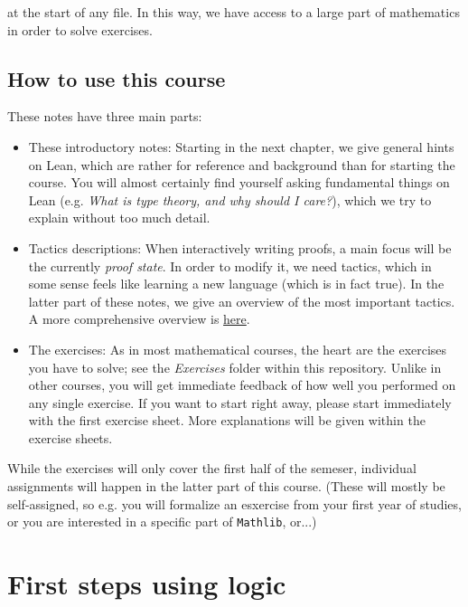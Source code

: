 \documentclass{memoir}
\begin{document}
at the start of any file. In this way, we have access to a large part of mathematics in order to solve exercises.



\section{How to use this course}

These notes have three main parts:

\begin{itemize}
\item These introductory notes: Starting in the next chapter, we give general hints on Lean, which are rather for reference and background than for starting the course. You will almost certainly find yourself asking fundamental things on Lean (e.g. \emph{What is type theory, and why should I care?}), which we try to explain without too much detail.\item Tactics descriptions: When interactively writing proofs, a main focus will be the currently \emph{proof state}. In order to modify it, we need tactics, which in some sense feels like learning a new language (which is in fact true). In the latter part of these notes, we give an overview of the most important tactics. A more comprehensive overview is \hyperlink{"https://github.com/haruhisa-enomoto/mathlib4-all-tactics/blob/main/all-tactics.md"}{here}.\item The exercises: As in most mathematical courses, the heart are the exercises you have to solve; see the \emph{Exercises} folder within this repository. Unlike in other courses, you will get immediate feedback of how well you performed on any single exercise. If you want to start right away, please start immediately with the first exercise sheet. More explanations will be given within the exercise sheets.
\end{itemize}


While the exercises will only cover the first half of the semeser, individual assignments will happen in the latter part of this course. (These will mostly be self-assigned, so e.g. you will formalize an esxercise from your first year of studies, or you are interested in a specific part of \Verb|Mathlib|, or...)




\chapter{First steps using logic}
\end{document}
